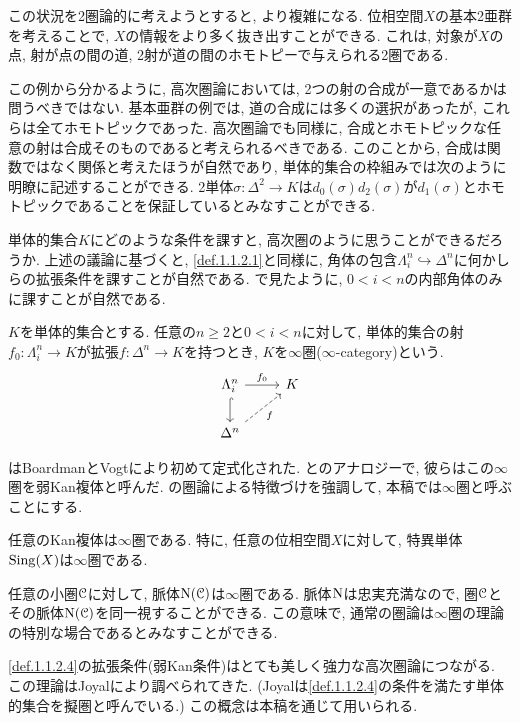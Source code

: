 \documentclass[uplatex, a4paper, 14Q, dvipdfmx]{jsreport}
\begin{document}
この状況を2圏論的に考えようとすると, より複雑になる. 
位相空間$X$の基本2亜群を考えることで, $X$の情報をより多く抜き出すことができる. 
これは, 対象が$X$の点, 射が点の間の道, 2射が道の間のホモトピーで与えられる2圏である.

この例から分かるように, 高次圏論においては, 2つの射の合成が一意であるかは問うべきではない. 
基本亜群の例では, 道の合成には多くの選択があったが, これらは全てホモトピックであった. 
高次圏論でも同様に, 合成とホモトピックな任意の射は合成そのものであると考えられるべきである. 
このことから, 合成は関数ではなく関係と考えたほうが自然であり, 単体的集合の枠組みでは次のように明瞭に記述することができる. 
2単体$\sigma : \Delta^2 \to K$は$d_0(\sigma)d_2(\sigma)$が$d_1(\sigma)$とホモトピックであることを保証しているとみなすことができる.

単体的集合$K$にどのような条件を課すと, 高次圏のように思うことができるだろうか. 
上述の議論に基づくと, \cref{def.1.1.2.1}と同様に, 角体の包含$\Lambda^n_i \hookrightarrow \Delta^n$に何かしらの拡張条件を課すことが自然である. 
で見たように, $0<i<n$の内部角体のみに課すことが自然である. 

\begin{definition}[$\infty$圏] \label{def.1.1.2.4}
  $K$を単体的集合とする. 
  任意の$n \geq 2$と$0<i<n$に対して, 単体的集合の射$f_0 : \Lambda^n_i \to K$が拡張$f : \Delta^n \to K$を持つとき, $K$を$\infty$圏($\infty$-category)という.
  \[\begin{tikzcd}
    {\Lambda^n_i} & K \\
    {\Delta^n}
    \arrow["{f_0}", from=1-1, to=1-2]
    \arrow[hook, from=1-1, to=2-1]
    \arrow["f"', dashed, from=2-1, to=1-2]
  \end{tikzcd}\]
\end{definition}

はBoardmanとVogtにより初めて定式化された.
とのアナロジーで, 彼らはこの$\infty$圏を弱Kan複体と呼んだ. 
の圏論による特徴づけを強調して, 本稿では$\infty$圏と呼ぶことにする.

\begin{example} \label{eg.1.2.2.5}
  任意のKan複体は$\infty$圏である. 
  特に, 任意の位相空間$X$に対して, 特異単体$\mathrm{Sing}(X)$は$\infty$圏である. 
\end{example}

\begin{example} \label{eg.1.1.2.6}
  任意の小圏$\mathcal{C}$に対して, 脈体$\mathrm{N}(\mathcal{C})$は$\infty$圏である. 
  脈体$\mathrm{N}$は忠実充満なので, 圏$\mathcal{C}$とその脈体$\mathrm{N}(\mathcal{C})$を同一視することができる. 
  この意味で, 通常の圏論は$\infty$圏の理論の特別な場合であるとみなすことができる. 
\end{example}

\cref{def.1.1.2.4}の拡張条件(弱Kan条件)はとても美しく強力な高次圏論につながる.
この理論はJoyalにより調べられてきた. (Joyalは\cref{def.1.1.2.4}の条件を満たす単体的集合を擬圏と呼んでいる.)
この概念は本稿を通じて用いられる. 
\end{document}
